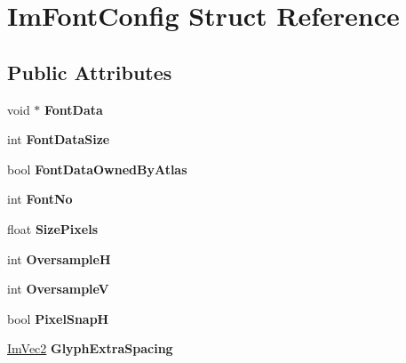 \hypertarget{struct_im_font_config}{}\section{Im\+Font\+Config Struct Reference}
\label{struct_im_font_config}
\subsection*{Public Attributes}
\begin{DoxyCompactItemize}
\item 
\mbox{\label{struct_im_font_config_a0265861de7ba7b0d953e1c97e7a50cf3}} 
void $\ast$ {\bfseries Font\+Data}
\item 
\mbox{\label{struct_im_font_config_a39df7ad3bb496421ce2cc5d2428345ef}} 
int {\bfseries Font\+Data\+Size}
\item 
\mbox{\label{struct_im_font_config_a99dfbf61ef79cee89b6f03e17cbe63b4}} 
bool {\bfseries Font\+Data\+Owned\+By\+Atlas}
\item 
\mbox{\label{struct_im_font_config_ab37ee3d5cf76000a4000e9296161e527}} 
int {\bfseries Font\+No}
\item 
\mbox{\label{struct_im_font_config_a2eff9cc7a11461414402f08ab910d277}} 
float {\bfseries Size\+Pixels}
\item 
\mbox{\label{struct_im_font_config_ab460df0d8019ffa8d124e8988c710910}} 
int {\bfseries OversampleH}
\item 
\mbox{\label{struct_im_font_config_a8018f84c60bfafb2b4629aeb77a047cb}} 
int {\bfseries OversampleV}
\item 
\mbox{\label{struct_im_font_config_a635b5fa03934467891fa949a037b5b89}} 
bool {\bfseries Pixel\+SnapH}
\item 
\mbox{\label{struct_im_font_config_a82db103689b1c434ec92875721967c07}} 
\mbox{\hyperlink{struct_im_vec2}{Im\+Vec2}} {\bfseries Glyph\+Extra\+Spacing}
\item 

\end{DoxyCompactItemize}
